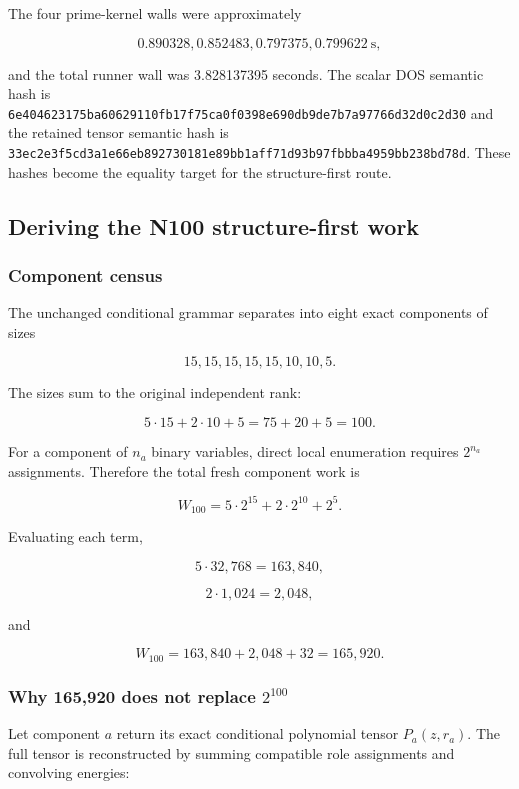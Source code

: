 The four prime-kernel walls were approximately

\[
0.890328, 0.852483, 0.797375, 0.799622\ \text{s},
\]

and the total runner wall was 3.828137395 seconds. The scalar DOS
semantic hash is
\nolinkurl{6e404623175ba60629110fb17f75ca0f0398e690db9de7b7a97766d32d0c2d30}
and the retained tensor semantic hash is
\nolinkurl{33ec2e3f5cd3a1e66eb892730181e89bb1aff71d93b97fbbba4959bb238bd78d}.
These hashes become the equality target for the structure-first route.

\subsection{Deriving the N100 structure-first
work}\label{viii-ch01-deriving-the-n100-structure-first-work}

\subsubsection{Component census}\label{viii-ch01-component-census}

The unchanged conditional grammar separates into eight exact components
of sizes

\[
15,15,15,15,15,10,10,5.
\]

The sizes sum to the original independent rank:

\[
5\cdot15+2\cdot10+5=75+20+5=100.
\]

For a component of \(n_a\) binary variables, direct local enumeration
requires \(2^{n_a}\) assignments. Therefore the total fresh component
work is

\[
W_{100}=5\cdot2^{15}+2\cdot2^{10}+2^5.
\]

Evaluating each term,

\[
5\cdot32{,}768=163{,}840,
\]

\[
2\cdot1{,}024=2{,}048,
\]

and

\[
W_{100}=163{,}840+2{,}048+32=165{,}920.
\]

\subsubsection{\texorpdfstring{Why 165,920 does not replace
\(2^{100}\)}{Why 165,920 does not replace 2\^{}\{100\}}}\label{viii-ch01-why-165920-does-not-replace-2100}

Let component \(a\) return its exact conditional polynomial tensor
\(P_a(z,r_a)\). The full tensor is reconstructed by summing compatible
role assignments and convolving energies:

